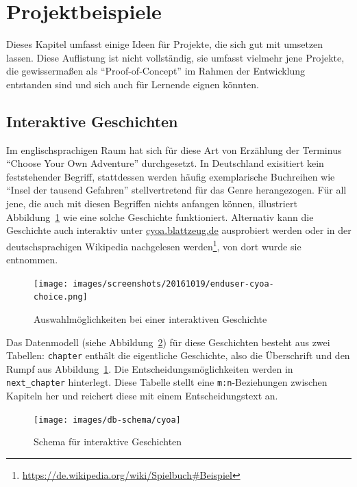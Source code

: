 \section{Projektbeispiele}
\label{sec:project-examples}

Dieses Kapitel umfasst einige Ideen für Projekte, die sich gut mit \idename{} umsetzen lassen. Diese Auflistung ist nicht vollständig, sie umfasst vielmehr jene Projekte, die gewissermaßen als "`Proof-of-Concept"' im Rahmen der Entwicklung entstanden sind und sich auch für Lernende eignen könnten.

\subsection{Interaktive Geschichten}
\label{sec:project-cyoa}

Im englischsprachigen Raum hat sich für diese Art von Erzählung der Terminus "`Choose Your Own Adventure"' durchgesetzt. In Deutschland exisitiert kein feststehender Begriff, stattdessen werden häufig exemplarische Buchreihen wie "`Insel der tausend Gefahren"' stellvertretend für das Genre herangezogen. Für all jene, die auch mit diesen Begriffen nichts anfangen können, illustriert Abbildung~\ref{fig:enduser-cyoa-choice} wie eine solche Geschichte funktioniert. Alternativ kann die Geschichte auch interaktiv unter \href{http://cyoa.blattzeug.de/}{cyoa.blattzeug.de} ausprobiert werden oder in der deutschsprachigen Wikipedia nachgelesen werden\footnote{\url{https://de.wikipedia.org/wiki/Spielbuch\#Beispiel}}, von dort wurde sie entnommen.

\begin{figure}[h]
  \centering \texttt{[image: images/screenshots/20161019/enduser-cyoa-choice.png]}
  \caption{Auswahlmöglichkeiten bei einer interaktiven Geschichte}
  \label{fig:enduser-cyoa-choice}
\end{figure}

Das Datenmodell (siehe Abbildung~\ref{fig:project-cyoa-schema}) für diese Geschichten besteht aus zwei Tabellen: \texttt{chapter} enthält die eigentliche Geschichte, also die Überschrift und den Rumpf aus Abbildung~\ref{fig:enduser-cyoa-choice}. Die Entscheidungsmöglichkeiten werden in \texttt{next\_chapter} hinterlegt. Diese Tabelle stellt eine \texttt{m:n}-Beziehungen zwischen Kapiteln her und reichert diese mit einem Entscheidungstext an.

\begin{figure}[h]
  \centering \texttt{[image: images/db-schema/cyoa]}
  \caption{Schema für interaktive Geschichten}
  \label{fig:project-cyoa-schema}
\end{figure}

